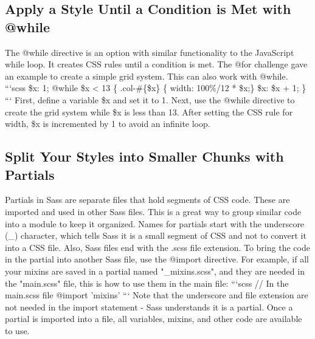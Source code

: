 \documentclass{article}%
\begin{document}
\subsection{Apply a Style Until a Condition is Met with @while}%
\label{subsec:ApplyaStyleUntilaConditionisMetwith@while}%
The @while directive is an option with similar functionality to the JavaScript while loop. It creates CSS rules until a condition is met.\newline%
The @for challenge gave an example to create a simple grid system. This can also work with @while.\newline%
```scss\newline%
\$x: 1;\newline%
@while \$x < 13 \{\newline%
  .col{-}\#\{\$x\} \{ width: 100\%/12 * \$x;\}\newline%
  \$x: \$x + 1;\newline%
\}\newline%
```\newline%
First, define a variable \$x and set it to 1. Next, use the @while directive to create the grid system while \$x is less than 13.\newline%
After setting the CSS rule for width, \$x is incremented by 1 to avoid an infinite loop.\newline%

%
\subsection{Split Your Styles into Smaller Chunks with Partials}%
\label{subsec:SplitYourStylesintoSmallerChunkswithPartials}%
Partials in Sass are separate files that hold segments of CSS code. These are imported and used in other Sass files. This is a great way to group similar code into a module to keep it organized.\newline%
Names for partials start with the underscore (\_) character, which tells Sass it is a small segment of CSS and not to convert it into a CSS file. Also, Sass files end with the .scss file extension. To bring the code in the partial into another Sass file, use the @import directive.\newline%
For example, if all your mixins are saved in a partial named "\_mixins.scss", and they are needed in the "main.scss" file, this is how to use them in the main file:\newline%
```scss\newline%
// In the main.scss file\newline%
@import 'mixins'\newline%
```\newline%
Note that the underscore and file extension are not needed in the import statement {-} Sass understands it is a partial. Once a partial is imported into a file, all variables, mixins, and other code are available to use.\newline%
\end{document}

